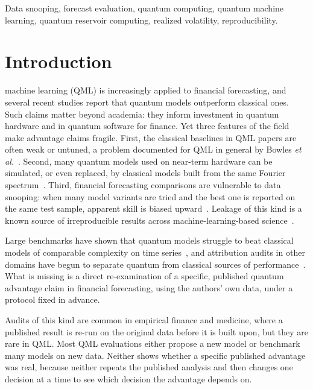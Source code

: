 \documentclass{ieeeaccess}
\begin{document}
\begin{keywords}
Data snooping, forecast evaluation, quantum computing, quantum machine learning, quantum reservoir computing, realized volatility, reproducibility.
\end{keywords}

\titlepgskip=-21pt

\maketitle

\section{Introduction}
\label{sec:introduction}
 machine learning (QML) is increasingly applied to financial forecasting, and several recent studies report that quantum models outperform classical ones. Such claims matter beyond academia: they inform investment in quantum hardware and in quantum software for finance. Yet three features of the field make advantage claims fragile. First, the classical baselines in QML papers are often weak or untuned, a problem documented for QML in general by Bowles \emph{et al.}~\cite{bowles2024}. Second, many quantum models used on near-term hardware can be simulated, or even replaced, by classical models built from the same Fourier spectrum~\cite{schuld2021,schreiber2023,sweke2025}. Third, financial forecasting comparisons are vulnerable to data snooping: when many model variants are tried and the best one is reported on the same test sample, apparent skill is biased upward~\cite{white2000,hansen2005,bailey2014}. Leakage of this kind is a known source of irreproducible results across machine-learning-based science~\cite{kapoor2023}.

Large benchmarks have shown that quantum models struggle to beat classical models of comparable complexity on time series~\cite{fellner2026}, and attribution audits in other domains have begun to separate quantum from classical sources of performance~\cite{gillani2026}. What is missing is a direct re-examination of a specific, published quantum advantage claim in financial forecasting, using the authors' own data, under a protocol fixed in advance.

Audits of this kind are common in empirical finance and medicine, where a published result is re-run on the original data before it is built upon, but they are rare in QML. Most QML evaluations either propose a new model or benchmark many models on new data. Neither shows whether a specific published advantage was real, because neither repeats the published analysis and then changes one decision at a time to see which decision the advantage depends on.
\end{document}
